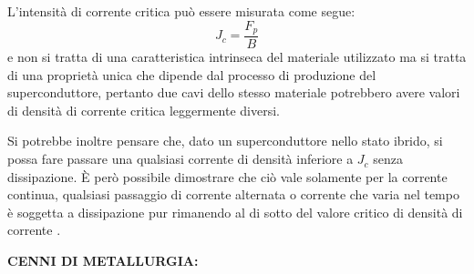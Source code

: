 \documentclass[a4paper,10pt]{article}
\begin{document}
L'intensità di corrente critica può essere misurata come segue:
\begin{equation*}
	J_c = \frac{F_p}{B}
\end{equation*}
e non si tratta di una caratteristica intrinseca del materiale utilizzato ma si tratta di una proprietà unica che dipende dal processo di produzione del superconduttore, pertanto due cavi dello stesso materiale potrebbero avere valori di densità di corrente critica leggermente diversi.

Si potrebbe inoltre pensare che, dato un superconduttore nello stato ibrido, si possa fare passare una qualsiasi corrente di densità inferiore a $J_c$ senza dissipazione. È però possibile dimostrare che ciò vale solamente per la corrente continua, qualsiasi passaggio di corrente alternata o corrente che varia nel tempo è soggetta a dissipazione pur rimanendo al di sotto del valore critico di densità di corrente \cite{mat-pinning}.

\bigskip
{}
\label{sec:metallurgy}
\noindent
\textbf{CENNI DI METALLURGIA:}

\clearpage

\printbibliography
\end{document}
